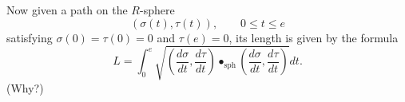 \documentclass[newpage,hints,handout]{ximera}
\begin{document}
 Now given a path on the $R$-sphere
 \[
 \left(\sigma(t),\tau(t)\right),\qquad 0 \leq t \leq e
 \]
 satisfying $\sigma(0)=\tau(0)=0$ and $\tau(e)=0$, its length is given by the
 formula%
 \begin{equation} \label{length}\tag{$*$}
   L=\int_{0}^e \sqrt{\left(\frac{d\sigma}{dt},\frac{d\tau}{dt}\right)
     \bullet_\mathrm{sph} \left(\frac{d\sigma}{dt},\frac{d\tau}{dt}\right)}dt.
 \end{equation}
 (Why?)
\end{document}
